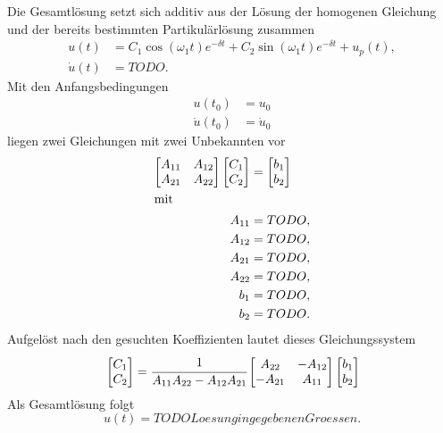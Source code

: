 \begin{solution}
    Die Gesamtlösung setzt sich additiv aus der Lösung der homogenen Gleichung und der bereits bestimmten Partikulärlösung zusammen
    \begin{align*}
     u(t) &= C_1\cos(\omega_1 t)e^{-\delta t} + C_2 \sin(\omega_1 t)e^{-\delta t} + u_p(t),\\
     \dot{u}(t) &= TODO.
    \end{align*}
    Mit den Anfangsbedingungen
    \begin{align*}
    u(t_0) &= u_0 \\
    \dot{u}(t_0) &= \dot{u}_0
    \end{align*}
    liegen zwei Gleichungen mit zwei Unbekannten vor
    \begin{align*}
    \begin{bmatrix}
     A_{11} & A_{12}\\
     A_{21} & A_{22}
    \end{bmatrix}
    \begin{bmatrix}
     C_1 \\
     C_2
    \end{bmatrix}
    &=
    \begin{bmatrix}
    b_1 \\
    b_2
    \end{bmatrix} \\
    \intertext{mit}
    A_{11}&= TODO,\\
    A_{12}&= TODO,\\
    A_{21}&= TODO,\\
    A_{22}&= TODO,\\
    b_{1}&= TODO,\\
    b_{2}&= TODO.
    \end{align*}
    Aufgelöst nach den gesuchten Koeffizienten lautet dieses Gleichungssystem
    \begin{align*}
    &\begin{bmatrix}
    C_1 \\
    C_2
    \end{bmatrix}
    = \cfrac{1}{A_{11}A_{22}-A_{12}A_{21}}
    \begin{bmatrix}
     A_{22} & -A_{12}\\
     -A_{21} & A_{11}
    \end{bmatrix}
    \begin{bmatrix}
     b_1 \\
     b_2
    \end{bmatrix}\\
 \end{align*}
 Als Gesamtlösung folgt
 \begin{equation*}
 u(t)=TODO Loesung in gegebenen Groessen.  
 \end{equation*}

\end{solution}
